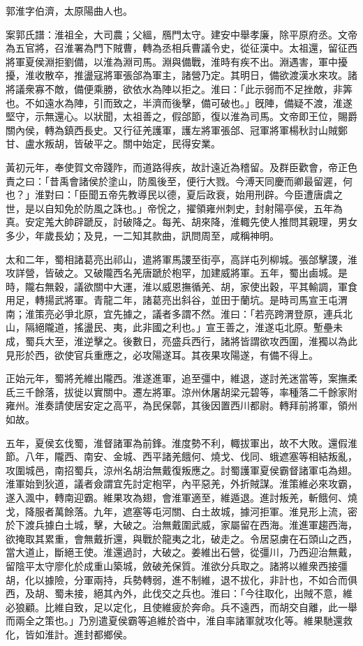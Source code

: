
\begin{pinyinscope}
郭淮字伯濟，太原陽曲人也。

案郭氏譜：淮祖全，大司農；父縕，鴈門太守。建安中舉孝廉，除平原府丞。文帝為五官將，召淮署為門下賊曹，轉為丞相兵曹議令史，從征漢中。太祖還，留征西將軍夏侯淵拒劉備，以淮為淵司馬。淵與備戰，淮時有疾不出。淵遇害，軍中擾擾，淮收散卒，推盪寇將軍張郃為軍主，諸營乃定。其明日，備欲渡漢水來攻。諸將議衆寡不敵，備便乘勝，欲依水為陣以拒之。淮曰：「此示弱而不足挫敵，非筭也。不如遠水為陣，引而致之，半濟而後擊，備可破也。」旣陣，備疑不渡，淮遂堅守，示無還心。以狀聞，太祖善之，假郃節，復以淮為司馬。文帝即王位，賜爵關內侯，轉為鎮西長史。又行征羌護軍，護左將軍張郃、冠軍將軍楊秋討山賊鄭甘、盧水叛胡，皆破平之。關中始定，民得安業。

黃初元年，奉使賀文帝踐阼，而道路得疾，故計遠近為稽留。及群臣歡會，帝正色責之曰：「昔禹會諸侯於塗山，防風後至，便行大戮。今溥天同慶而卿最留遲，何也？」淮對曰：「臣聞五帝先教導民以德，夏后政衰，始用刑辟。今臣遭唐虞之世，是以自知免於防風之誅也。」帝恱之，擢領雍州刺史，封射陽亭侯，五年為真。安定羗大帥辟蹏反，討破降之。每羌、胡來降，淮輙先使人推問其親理，男女多少，年歲長幼；及見，一二知其款曲，訊問周至，咸稱神明。

太和二年，蜀相諸葛亮出祁山，遣將軍馬謖至街亭，高詳屯列柳城。張郃擊謖，淮攻詳營，皆破之。又破隴西名羌唐蹏於枹罕，加建威將軍。五年，蜀出鹵城。是時，隴右無穀，議欲關中大運，淮以威恩撫循羌、胡，家使出穀，平其輸調，軍食用足，轉揚武將軍。青龍二年，諸葛亮出斜谷，並田于蘭坑。是時司馬宣王屯渭南；淮策亮必爭北原，宜先據之，議者多謂不然。淮曰：「若亮跨渭登原，連兵北山，隔絕隴道，搖盪民、夷，此非國之利也。」宣王善之，淮遂屯北原。塹壘未成，蜀兵大至，淮逆擊之。後數日，亮盛兵西行，諸將皆謂欲攻西圍，淮獨以為此見形於西，欲使官兵重應之，必攻陽遂耳。其夜果攻陽遂，有備不得上。

正始元年，蜀將羌維出隴西。淮遂進軍，追至彊中，維退，遂討羌迷當等，案撫柔氐三千餘落，拔徙以實關中。遷左將軍。涼州休屠胡梁元碧等，率種落二千餘家附雍州。淮奏請使居安定之高平，為民保鄣，其後因置西川都尉。轉拜前將軍，領州如故。

五年，夏侯玄伐蜀，淮督諸軍為前鋒。淮度勢不利，輙拔軍出，故不大敗。還假淮節。八年，隴西、南安、金城、西平諸羌餓何、燒戈、伐同、蛾遮塞等相結叛亂，攻圍城邑，南招蜀兵，涼州名胡治無戴復叛應之。討蜀護軍夏侯霸督諸軍屯為翅。淮軍始到狄道，議者僉謂宜先討定枹罕，內平惡羌，外折賊謀。淮策維必來攻霸，遂入渢中，轉南迎霸。維果攻為翅，會淮軍適至，維遁退。進討叛羌，斬餓何、燒戈，降服者萬餘落。九年，遮塞等屯河關、白土故城，據河拒軍。淮見形上流，密於下渡兵據白土城，擊，大破之。治無戴圍武威，家屬留在西海。淮進軍趨西海，欲掩取其累重，會無戴折還，與戰於龍夷之北，破走之。令居惡虜在石頭山之西，當大道止，斷絕王使。淮還過討，大破之。姜維出石營，從彊川，乃西迎治無戴，留陰平太守廖化於成重山築城，斂破羌保質。淮欲分兵取之。諸將以維衆西接彊胡，化以據險，分軍兩持，兵勢轉弱，進不制維，退不拔化，非計也，不如合而俱西，及胡、蜀未接，絕其內外，此伐交之兵也。淮曰：「今往取化，出賊不意，維必狼顧。比維自致，足以定化，且使維疲於奔命。兵不遠西，而胡交自離，此一舉而兩全之策也。」乃別遣夏侯霸等追維於沓中，淮自率諸軍就攻化等。維果馳還救化，皆如淮計。進封都鄉侯。


\end{pinyinscope}
